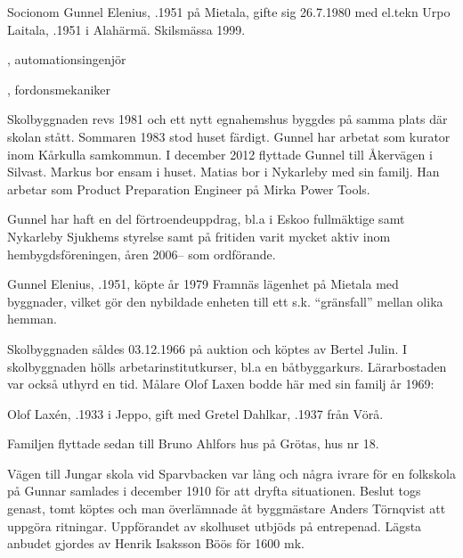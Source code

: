 Socionom Gunnel Elenius, .1951 på Mietala, gifte sig 26.7.1980 med el.tekn Urpo Laitala, .1951 i Alahärmä. Skilsmässa 1999.
\begin{jhchildren}
  \item {}, automationsingenjör
  \item {}, fordonsmekaniker
\end{jhchildren}

Skolbyggnaden revs 1981 och ett nytt egnahemshus byggdes på samma plats där skolan stått. Sommaren 1983 stod huset färdigt. Gunnel har arbetat som kurator inom Kårkulla samkommun. I december 2012 flyttade Gunnel till Åkervägen i Silvast. Markus bor ensam i huset. Matias bor i Nykarleby med sin familj. Han arbetar som Product Preparation Engineer på Mirka Power Tools.

Gunnel har haft en del förtroendeuppdrag, bl.a i  Eskoo fullmäktige samt Nykarleby Sjukhems styrelse samt på fritiden varit mycket aktiv inom hembygdsföreningen, åren 2006-- som ordförande.





Gunnel Elenius, .1951, köpte år 1979 Framnäs lägenhet på Mietala med byggnader, vilket gör den nybildade enheten till ett s.k. ``gränsfall'' mellan olika hemman.\jhvspace{}


Skolbyggnaden såldes 03.12.1966 på auktion och köptes av Bertel Julin. I skolbyggnaden hölls arbetarinstitutkurser, bl.a en båtbyggarkurs. Lärarbostaden var också uthyrd en tid. Målare Olof Laxen bodde här med sin familj år 1969:

Olof Laxén, .1933 i Jeppo, gift med Gretel Dahlkar, .1937 från Vörå.
\begin{jhchildren}
  \item {}
  \item {}
\end{jhchildren}

Familjen flyttade sedan till Bruno Ahlfors hus på Grötas, hus nr 18.


Vägen till Jungar skola vid Sparvbacken var lång och några ivrare för en folkskola på Gunnar samlades i december 1910 för att dryfta situationen. Beslut togs genast, tomt köptes och man överlämnade åt byggmästare Anders Törnqvist att uppgöra ritningar. Uppförandet av skolhuset utbjöds på entrepenad. Lägsta anbudet gjordes av Henrik Isaksson Böös för 1600 mk.

